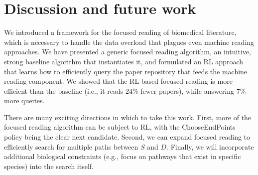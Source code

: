 \section{Discussion and future work}

We introduced a framework for the focused reading of biomedical literature, which is necessary to handle the data overload that plagues even machine reading approaches.
  We have presented a generic focused reading algorithm, an intuitive, strong baseline algorithm that instantiates it,  and formulated an RL approach that learns how to efficiently query the paper repository that feeds the machine reading component. %
We showed that the RL-based focused reading is more efficient than the baseline (i.e., it reads 24\% fewer papers), while answering 7\% more queries.

There are many exciting directions in which to take this work.  First, more of the focused reading algorithm can be subject to RL, with the {\sc ChooseEndPoints} policy being the clear next candidate.  
Second, we can expand focused reading to efficiently search for multiple paths between $S$ and $D$.  
Finally, we will incorporate additional biological constraints (e.g., focus on pathways that exist in specific species) into the search itself. 



